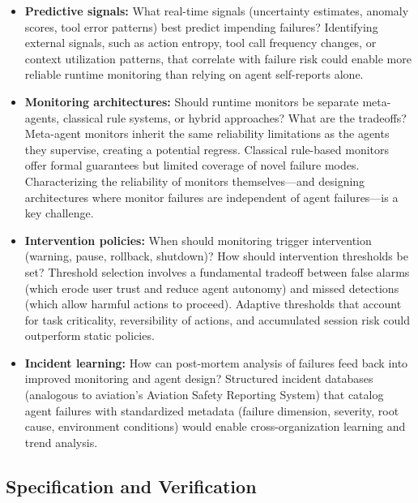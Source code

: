 \documentclass[11pt]{article}
\newcounter{dimension}
\begin{document}
\begin{itemize}[leftmargin=*]
    \item \textbf{Predictive signals:} What real-time signals (uncertainty estimates, anomaly scores, tool error patterns) best predict impending failures?
    Identifying external signals, such as action entropy, tool call frequency changes, or context utilization patterns, that correlate with failure risk could enable more reliable runtime monitoring than relying on agent self-reports alone.

    \item \textbf{Monitoring architectures:} Should runtime monitors be separate meta-agents, classical rule systems, or hybrid approaches?
    What are the tradeoffs?
    Meta-agent monitors inherit the same reliability limitations as the agents they supervise, creating a potential regress.
    Classical rule-based monitors offer formal guarantees but limited coverage of novel failure modes.
    Characterizing the reliability of monitors themselves---and designing architectures where monitor failures are independent of agent failures---is a key challenge.

    \item \textbf{Intervention policies:} When should monitoring trigger intervention (warning, pause, rollback, shutdown)?
    How should intervention thresholds be set?
    Threshold selection involves a fundamental tradeoff between false alarms (which erode user trust and reduce agent autonomy) and missed detections (which allow harmful actions to proceed).
    Adaptive thresholds that account for task criticality, reversibility of actions, and accumulated session risk could outperform static policies.

    \item \textbf{Incident learning:} How can post-mortem analysis of failures feed back into improved monitoring and agent design?
    Structured incident databases (analogous to aviation's Aviation Safety Reporting System) that catalog agent failures with standardized metadata (failure dimension, severity, root cause, environment conditions) would enable cross-organization learning and trend analysis.
\end{itemize}

\subsection{Specification and Verification}
\end{document}

